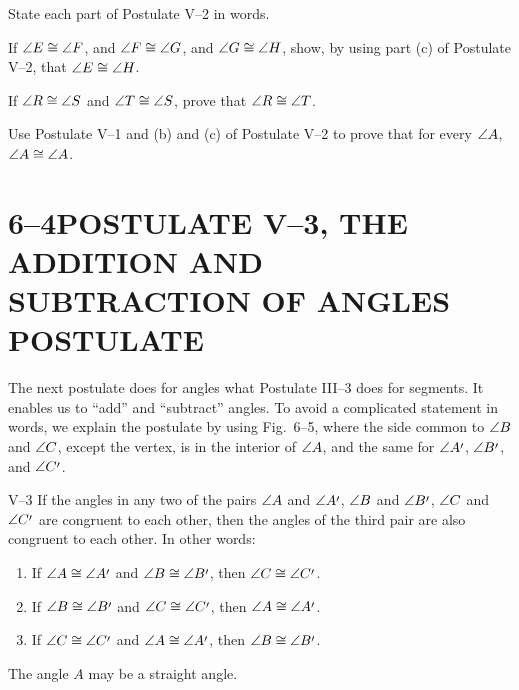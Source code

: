 \documentclass[11pt]{book}
\begin{document}
\begin{exercisecols}
\begin{exlist}
\item State each part of Postulate V--2 in words.
\item If $\angle E \cong \angle F$, and $\angle F \cong \angle G$, and
  $\angle G \cong \angle H$, show, by using part (c) of Postulate V--2, that
  $\angle E \cong \angle H$.
\item If $\angle R \cong \angle S$ and $\angle T \cong \angle S$, prove that
  $\angle R \cong \angle T$.
\item[\stex 4.] Use Postulate V--1 and (b) and (c) of Postulate V--2 to prove
  that for every $\angle A$, $\angle A \cong \angle A$.
\end{exlist}
\end{exercisecols}

\section*{6--4\quad POSTULATE V--3, THE ADDITION AND SUBTRACTION OF ANGLES POSTULATE}

The next postulate does for angles what Postulate III--3 does for segments. It
enables us to ``add'' and ``subtract'' angles. To avoid a complicated statement
in words, we explain the postulate by using Fig.~6--5, where the side common to
$\angle B$ and $\angle C$, except the vertex, is in the interior of $\angle A$,
and the same for $\ang{A\VIpr}$, $\ang{B\VIpr}$, and $\ang{C\VIpr}$.

\FIGVIFIVE

\medskip
\noindent
V--3 If the angles in any two of the pairs $\angle A$ and $\ang{A\VIpr}$,
$\angle B$ and $\ang{B\VIpr}$, $\angle C$ and $\ang{C\VIpr}$ are congruent to
each other, then the angles of the third pair are also congruent to each other.
In other words:
\begin{enumerate}[label=(\alph*), leftmargin=2.6em, itemsep=1pt, topsep=3pt]
\item If $\ang{A} \cong \ang{A\VIpr}$ and $\ang{B} \cong \ang{B\VIpr}$, then
  $\ang{C} \cong \ang{C\VIpr}$.
\item If $\ang{B} \cong \ang{B\VIpr}$ and $\ang{C} \cong \ang{C\VIpr}$, then
  $\ang{A} \cong \ang{A\VIpr}$.
\item If $\ang{C} \cong \ang{C\VIpr}$ and $\ang{A} \cong \ang{A\VIpr}$, then
  $\ang{B} \cong \ang{B\VIpr}$.
\end{enumerate}
\noindent The angle $A$ may be a straight angle.
\medskip
\end{document}

